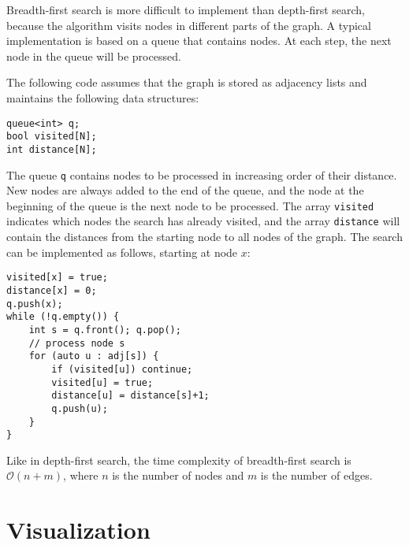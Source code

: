 \documentclass[twoside,12pt,a4paper,english]{book}
\theoremstyle{definition}
\theoremstyle{problemstyle}
\theoremstyle{problemstyle}
\theoremstyle{problemstyle}
\begin{document}
Breadth-first search is more difficult
to implement than depth-first search,
because the algorithm visits nodes
in different parts of the graph.
A typical implementation is based on
a queue that contains nodes.
At each step, the next node in the queue
will be processed.

The following code assumes that the graph is stored
as adjacency lists and maintains the following
data structures:
\begin{lstlisting}
queue<int> q;
bool visited[N];
int distance[N];
\end{lstlisting}

The queue \texttt{q}
contains nodes to be processed
in increasing order of their distance.
New nodes are always added to the end
of the queue, and the node at the beginning
of the queue is the next node to be processed.
The array \texttt{visited} indicates
which nodes the search has already visited,
and the array \texttt{distance} will contain the
distances from the starting node to all nodes of the graph.
\newpage
The search can be implemented as follows,
starting at node $x$:
\begin{lstlisting}
visited[x] = true;
distance[x] = 0;
q.push(x);
while (!q.empty()) {
    int s = q.front(); q.pop();
    // process node s
    for (auto u : adj[s]) {
        if (visited[u]) continue;
        visited[u] = true;
        distance[u] = distance[s]+1;
        q.push(u);
    }
}
\end{lstlisting}

Like in depth-first search,
the time complexity of breadth-first search
is $\mathcal{O}(n+m)$, where $n$ is the number of nodes
and $m$ is the number of edges.

\section{Visualization}

\begin{center}
\end{center}
\end{document}
